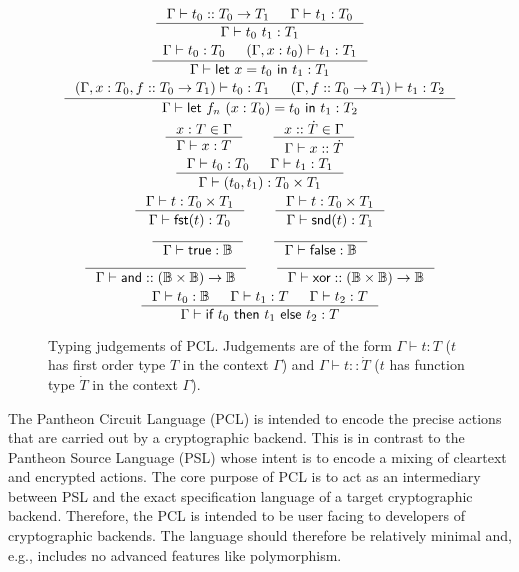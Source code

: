 \documentclass[11pt]{article}
\newcommand{\kw}[1]{\textsf{#1}}
\newcommand{\klet}{\kw{let}}
\newcommand{\kin}{\kw{in}}
\newcommand{\kfst}{\kw{fst}}
\newcommand{\ksnd}{\kw{snd}}
\newcommand{\ktrue}{\kw{true}}
\newcommand{\kfalse}{\kw{false}}
\newcommand{\kand}{\kw{and}}
\newcommand{\kxor}{\kw{xor}}
\newcommand{\kif}{\kw{if}}
\newcommand{\kthen}{\kw{then}}
\newcommand{\kelse}{\kw{else}}
\newcommand{\judges}{\vdash}
\begin{document}
\begin{figure}
\begin{spreadlines}{0.8em}
\begin{gather*}
\inference{%
  \Gamma \judges t_0 :: T_0 \rightarrow T_1&
  \Gamma \judges t_1 : T_0
}{%
  \Gamma \judges t_0~t_1 : T_1 
}
\\
\inference{%
  \Gamma \judges t_0 : T_0&
  (\Gamma, x:t_0) \judges t_1 : T_1
}{%
  \Gamma \judges \klet~x=t_0~\kin~t_1 : T_1
}
\\
\inference{%
  (\Gamma, x:T_0, f::T_0\rightarrow T_1) \judges t_0 : T_1&
  (\Gamma, f::T_0\rightarrow T_1) \judges t_1 : T_2
}{%
  \Gamma \judges \klet~f_n~(x:T_0)=t_0~\kin~t_1 : T_2
}
\\
\inference{%
  x:T \in \Gamma
}{%
  \Gamma \judges x : T
}
\qquad
\inference{%
  x::\dot{T} \in \Gamma
}{%
  \Gamma \judges x :: \dot{T}
}
\\
\inference{%
  \Gamma \judges t_0 : T_0&
  \Gamma \judges t_1 : T_1
}{%
  \Gamma \judges (t_0, t_1) : T_0 \times T_1
}
\\
\inference{%
  \Gamma \judges t : T_0 \times T_1
}{%
  \Gamma \judges \kfst(t) : T_0
}
\qquad
\inference{%
  \Gamma \judges t : T_0 \times T_1
}{%
  \Gamma \judges \ksnd(t) : T_1
}
\\
\inference{%
}{%
  \Gamma \judges \ktrue : \mathbb{B}
}
\qquad
\inference{%
}{%
  \Gamma \judges \kfalse : \mathbb{B}
}
\\
\inference{%
}{%
  \Gamma \judges \kand :: (\mathbb{B} \times \mathbb{B}) \rightarrow \mathbb{B}
}
\qquad
\inference{%
}{%
  \Gamma \judges \kxor :: (\mathbb{B} \times \mathbb{B}) \rightarrow \mathbb{B}
}
\\
\inference{%
  \Gamma \judges t_0 : \mathbb{B}&
  \Gamma \judges t_1 : T&
  \Gamma \judges t_2 : T
}{%
  \Gamma \judges \kif~t_0~\kthen~t_1~\kelse~t_2 : T
}
\end{gather*}	
\end{spreadlines}
\caption{%
Typing judgements of PCL. Judgements are of the form $\Gamma \judges t : T$ ($t$ has first order type $T$ in the context $\Gamma$) and $\Gamma \judges t :: \dot{T}$ ($t$ has function type $\dot{T}$ in the context $\Gamma$).
}\label{fig:judgements}
\end{figure}

The Pantheon Circuit Language (PCL) is intended to encode the precise actions that are carried out by a cryptographic backend.
This is in contrast to the Pantheon Source Language (PSL) whose intent is to encode a mixing of cleartext and encrypted actions.
The core purpose of PCL is to act as an intermediary between PSL and the exact specification language of a target cryptographic backend.
%
Therefore, the PCL is intended to be user facing to developers of cryptographic backends.
The language should therefore be relatively minimal and, e.g., includes no advanced features like polymorphism.
\end{document}
